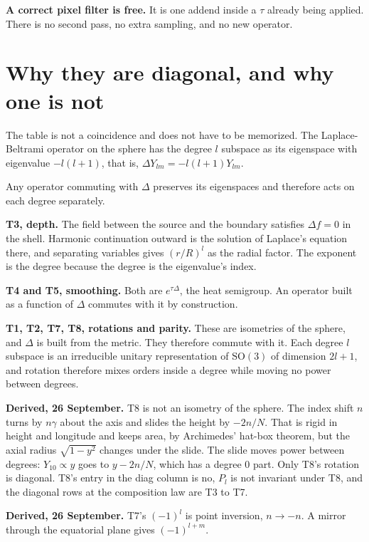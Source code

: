 \textbf{A correct pixel filter is free.} It is one addend inside a \(\tau\) already being applied. There is no second pass, no extra sampling, and no new operator.

\section{Why they are diagonal, and why one is not}

The table is not a coincidence and does not have to be memorized. The Laplace-Beltrami operator on the sphere has the degree \(l\) subspace as its eigenspace with eigenvalue \(-l(l+1)\), that is, \(\Delta Y_{lm} = -l(l+1) Y_{lm}\).

Any operator commuting with \(\Delta\) preserves its eigenspaces and therefore acts on each degree separately.

\textbf{T3, depth.} The field between the source and the boundary satisfies \(\Delta f = 0\) in the shell. Harmonic continuation outward is the solution of Laplace's equation there, and separating variables gives \((r/R)^l\) as the radial factor. The exponent is the degree because the degree is the eigenvalue's index.

\textbf{T4 and T5, smoothing.} Both are \(e^{\tau\Delta}\), the heat semigroup. An operator built as a function of \(\Delta\) commutes with it by construction.

\textbf{T1, T2, T7, T8, rotations and parity.} These are isometries of the sphere, and \(\Delta\) is built from the metric. They therefore commute with it. Each degree \(l\) subspace is an irreducible unitary representation of \(\mathrm{SO}(3)\) of dimension \(2l+1\), and rotation therefore mixes orders inside a degree while moving no power between degrees.

\textbf{Derived, 26 September.} T8 is not an isometry of the sphere. The index shift \(n\) turns by \(n\gamma\) about the axis and slides the height by \(-2n/N\). That is rigid in height and longitude and keeps area, by Archimedes' hat-box theorem, but the axial radius \(\sqrt{1 - y^2}\) changes under the slide. The slide moves power between degrees: \(Y_{10} \propto y\) goes to \(y - 2n/N\), which has a degree \(0\) part. Only T8's rotation is diagonal. T8's entry in the diag column is no, \(P_l\) is not invariant under T8, and the diagonal rows at the composition law are T3 to T7.

\textbf{Derived, 26 September.} T7's \((-1)^l\) is point inversion, \(n \to -n\). A mirror through the equatorial plane gives \((-1)^{l+m}\).

